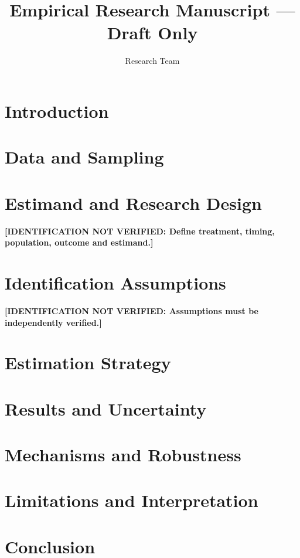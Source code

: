 \documentclass[11pt]{article}
\newcommand{\identificationpending}[1]{\textbf{[IDENTIFICATION NOT VERIFIED: #1]}}
\begin{document}
\title{Empirical Research Manuscript --- Draft Only}
\author{Research Team}
\date{}
\maketitle
\section{Introduction}
\section{Data and Sampling}
\section{Estimand and Research Design}
\identificationpending{Define treatment, timing, population, outcome and estimand.}
\section{Identification Assumptions}
\identificationpending{Assumptions must be independently verified.}
\section{Estimation Strategy}
\section{Results and Uncertainty}
\section{Mechanisms and Robustness}
\section{Limitations and Interpretation}
\section{Conclusion}
\end{document}
